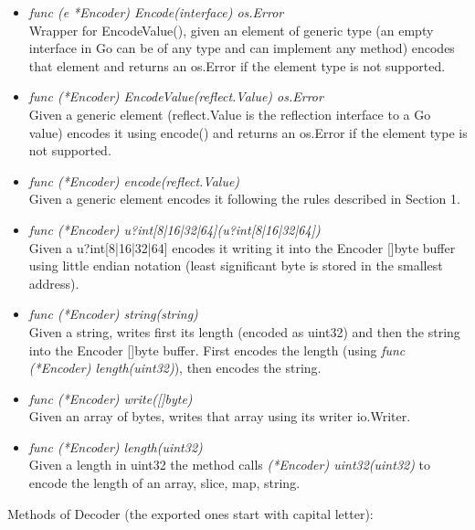 \begin{itemize}

	\item \emph{func (e *Encoder)  Encode(interface{}) os.Error}\\
	Wrapper for EncodeValue(), given an element of generic type (an empty interface in Go can be of any type and can implement any method) encodes that element and returns an os.Error if the element type is not supported.
	
	\item \emph{func (*Encoder) EncodeValue(reflect.Value) os.Error}\\
	Given a generic element (reflect.Value is the reflection interface to a Go value) encodes it using encode() and returns an os.Error if the element type is not supported.
	
	\item \emph{func (*Encoder) encode(reflect.Value)}\\
	Given a generic element encodes it following the rules described in Section 1.
	
	\item \emph{func (*Encoder) u?int[8|16|32|64](u?int[8|16|32|64])}\\
	Given a u?int[8|16|32|64] encodes it writing it into the Encoder []byte buffer using little endian notation (least significant byte is stored in the smallest address).
	
	\item \emph{func (*Encoder) string(string)}\\
	Given a string, writes first its length (encoded as uint32) and then the string into the Encoder []byte buffer. First encodes the length (using \emph{func (*Encoder) length(uint32)}), then encodes the string.
	
	\item \emph{func (*Encoder) write([]byte)}\\
	Given an array of bytes, writes that array using its writer io.Writer.
	
	\item \emph{func (*Encoder) length(uint32)}\\
	Given a length in uint32 the method calls \emph{(*Encoder) uint32(uint32)} to encode the length of an array, slice, map, string.

\end{itemize}

Methods of Decoder (the exported ones start with capital letter):

